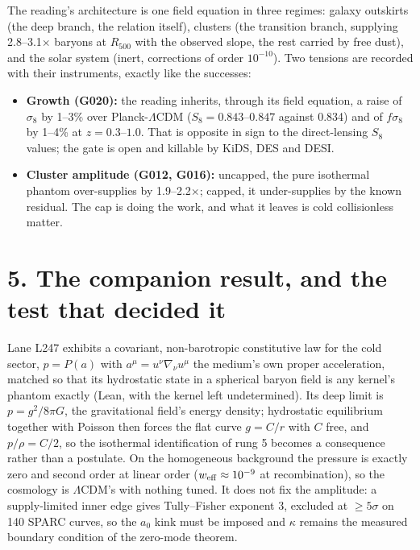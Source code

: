 \documentclass[
  11pt,
]{article}
\providecommand{\tightlist}{%
  \setlength{\itemsep}{0pt}\setlength{\parskip}{0pt}}
\begin{document}
The reading's architecture is one field equation in three regimes:
galaxy outskirts (the deep branch, the relation itself), clusters (the
transition branch, supplying 2.8--3.1\(\times\) baryons at \(R_{500}\)
with the observed slope, the rest carried by free dust), and the solar
system (inert, corrections of order \(10^{-10}\)). Two tensions are
recorded with their instruments, exactly like the successes:

\begin{itemize}
\tightlist
\item
  \textbf{Growth (G020):} the reading inherits, through its field
  equation, a raise of \(\sigma_8\) by 1--3\% over Planck-\(\Lambda\)CDM
  (\(S_8 = 0.843\)--\(0.847\) against 0.834) and of \(f\sigma_8\) by
  1--4\% at \(z = 0.3\)--\(1.0\). That is opposite in sign to the
  direct-lensing \(S_8\) values; the gate is open and killable by KiDS,
  DES and DESI.
\item
  \textbf{Cluster amplitude (G012, G016):} uncapped, the pure isothermal
  phantom over-supplies by 1.9--2.2\(\times\); capped, it under-supplies
  by the known residual. The cap is doing the work, and what it leaves
  is cold collisionless matter.
\end{itemize}

\section{5. The companion result, and the test that decided
it}\label{the-companion-result-and-the-test-that-decided-it}

Lane L247 exhibits a covariant, non-barotropic constitutive law for the
cold sector, \(p = P(a)\) with \(a^\mu = u^\nu\nabla_\nu u^\mu\) the
medium's own proper acceleration, matched so that its hydrostatic state
in a spherical baryon field is any kernel's phantom exactly (Lean, with
the kernel left undetermined). Its deep limit is \(p = g^2/8\pi G\), the
gravitational field's energy density; hydrostatic equilibrium together
with Poisson then forces the flat curve \(g = C/r\) with \(C\) free, and
\(p/\rho = C/2\), so the isothermal identification of rung 5 becomes a
consequence rather than a postulate. On the homogeneous background the
pressure is exactly zero and second order at linear order
(\(w_{\rm eff} \approx 10^{-9}\) at recombination), so the cosmology is
\(\Lambda\)CDM's with nothing tuned. It does not fix the amplitude: a
supply-limited inner edge gives Tully--Fisher exponent 3, excluded at
\(\ge 5\sigma\) on 140 SPARC curves, so the \(a_0\) kink must be imposed
and \(\kappa\) remains the measured boundary condition of the zero-mode
theorem.
\end{document}
